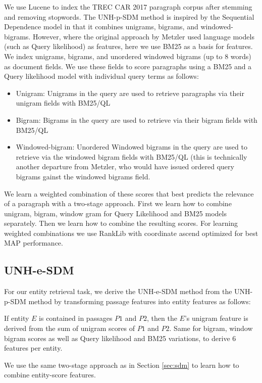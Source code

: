 \documentclass{article}
\begin{document}
We use Lucene to index the TREC CAR 2017 paragraph corpus after stemming and removing stopwords.
The UNH-p-SDM method is inspired by the Sequential Dependence model \cite{metzler2005markov} in that it combines unigrams, bigrams, and windowed-bigrams. However, where the original approach by Metzler used language models (such as Query likelihood) as features, here we use BM25 as a basis for features. 
 We index unigrams, bigrams, and unordered windowed bigrams (up to 8 words) as document fields. We use these fields to score paragraphs using a BM25 and a Query likelihood model with individual query terms as follows:
 
 \begin{itemize}
     \item Unigram: Unigrams in the query are used to retrieve paragraphs via their unigram fields with BM25/QL
     \item Bigram: Bigrams in the query are used to retrieve via their bigram fields with BM25/QL
     \item Windowed-bigram: Unordered Windowed bigrams in the query are used to retrieve via the windowed bigram fields with BM25/QL (this is technically another departure from Metzler, who would have issued ordered query bigrams gainst the windowed bigrams field.
 \end{itemize}
 

We learn a weighted combination of these scores that best predicts the relevance of a paragraph with a two-stage approach. First we learn how to combine unigram, bigram, window gram for Query Likelihood and BM25 models separately. Then we learn how to combine the resulting scores. For learning weighted combinations we use RankLib with coordinate ascend optimized for best MAP performance.


\subsection{UNH-e-SDM}

For our entity retrieval task, we derive the UNH-e-SDM method from the UNH-p-SDM method by transforming passage features into entity features as follows:

If entity $E$ is contained in passages $P1$ and $P2$, then the $E$'s unigram feature is derived from the sum of unigram scores of $P1$ and $P2$. Same for bigram, window bigram scores as well as Query likelihood and BM25 variations, to derive 6 features per entity.

We use the same two-stage approach as in Section \ref{sec:sdm} to learn how to combine entity-score features.
\end{document}
